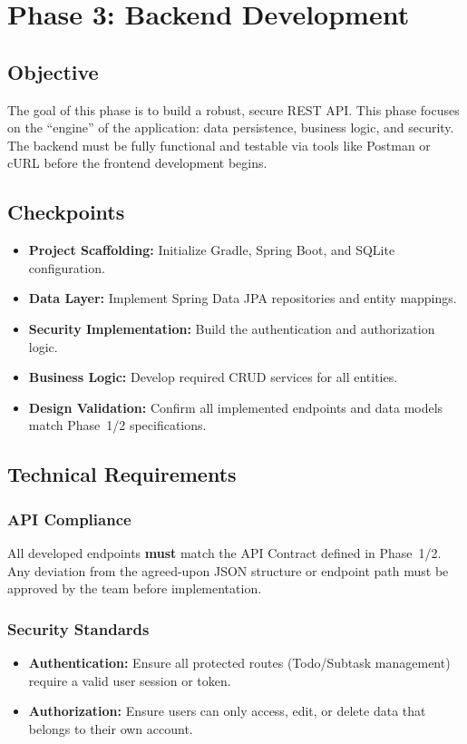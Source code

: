 \newpage
\section{Phase 3: Backend Development}\label{sec:phase3}

\subsection{Objective}
The goal of this phase is to build a robust, secure REST API. This phase focuses on the
``engine'' of the application: data persistence, business logic, and security. The backend
must be fully functional and testable via tools like Postman or cURL before the frontend development begins.

\subsection{Checkpoints}
\begin{itemize}
  \item[$\square$] \textbf{Project Scaffolding:} Initialize Gradle, Spring Boot, and SQLite configuration.
  \item[$\square$] \textbf{Data Layer:} Implement Spring Data JPA repositories and entity mappings.
  \item[$\square$] \textbf{Security Implementation:} Build the authentication and authorization logic.
  \item[$\square$] \textbf{Business Logic:} Develop required CRUD services for all entities.
  \item[$\square$] \textbf{Design Validation:} Confirm all implemented endpoints and data models match Phase~1/2 specifications.
\end{itemize}

\subsection{Technical Requirements}

\subsubsection{API Compliance}
All developed endpoints \textbf{must} match the API Contract defined in Phase~1/2. Any deviation from
the agreed-upon JSON structure or endpoint path must be approved by the team before implementation.

\subsubsection{Security Standards}
\begin{itemize}
  \item \textbf{Authentication:} Ensure all protected routes (Todo/Subtask management) require a valid user session or token.
  \item \textbf{Authorization:} Ensure users can only access, edit, or delete data that belongs to their own account.
\end{itemize}

